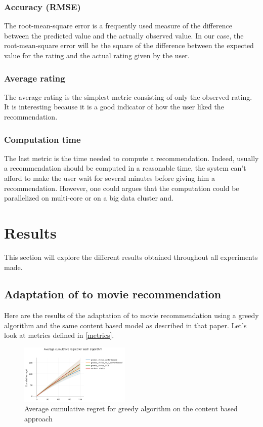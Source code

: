 \documentclass[letterpaper]{article}
\begin{document}
\subsubsection{Accuracy (RMSE)}

The root-mean-square error is a frequently used measure of the difference between the predicted value and the actually observed value. In our case, the root-mean-square error will be the square of the difference between the expected value for the rating and the actual rating given by the user.

\subsubsection{Average rating}

The average rating is the simplest metric consisting of only the observed rating. It is interesting because it is a good indicator of how the user liked the recommendation.

\subsubsection{Computation time}

The last metric is the time needed to compute a recommendation. Indeed, usually a recommendation should be computed in a reasonable time, the system can't afford to make the user wait for several minutes before giving him a recommendation. However, one could argues that the computation could be parallelized on multi-core or on a big data cluster and.  


\section{Results} \label{results}

This section will explore the different results obtained throughout all experiments made.

\subsection{Adaptation of \cite{main} to movie recommendation}

Here are the results of the adaptation of \cite{main} to movie recommendation using a greedy algorithm and the same content based model as described in that paper. Let's look at metrics defined in \ref{metrics}.

\begin{figure}[H]
\begin{center}
\includegraphics[width=0.47\textwidth]{img/greedy0.png}
\caption{Average cumulative regret for greedy algorithm on the content based approach}
\label{greedy0}
\end{center}
\end{figure}
\end{document}
